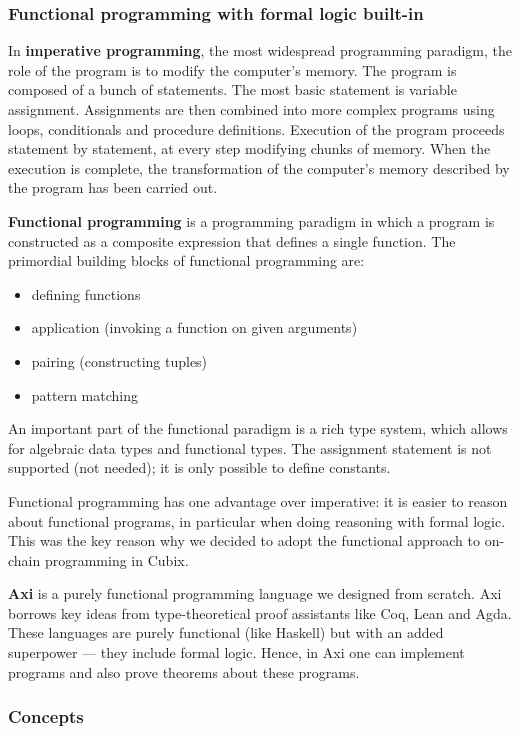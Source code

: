 \documentclass[a4paper]{article}
\begin{document}
\subsubsection{Functional programming with formal logic built-in}

In \textbf{imperative programming}, the most widespread programming paradigm, the role of the program is to modify the computer's memory. The program is composed of a bunch of statements. The most basic statement is variable assignment. Assignments are then combined into more complex programs using loops, conditionals and procedure definitions. Execution of the program proceeds statement by statement, at every step modifying chunks of memory. When the execution is complete, the transformation of the computer's memory described by the program has been carried out.

\textbf{Functional programming} is a programming paradigm in which a program is constructed as a composite expression that defines a single function. The primordial building blocks of functional programming are:

\begin{itemize}
  \item defining functions
  \item application (invoking a function on given arguments)
  \item pairing (constructing tuples)
  \item pattern matching
\end{itemize}

An important part of the functional paradigm is a rich type system, which allows for algebraic data types and functional types. The assignment statement is not supported (not needed); it is only possible to define constants.

Functional programming has one advantage over imperative: it is easier to reason about functional programs, in particular when doing reasoning with formal logic. This was the key reason why we decided to adopt the functional approach to on-chain programming in Cubix.

\textbf{Axi} is a purely functional programming language we designed from scratch. Axi borrows key ideas from type-theoretical proof assistants like Coq, Lean and Agda. These languages are purely functional (like Haskell) but with an added superpower --- they include formal logic. Hence, in Axi one can implement programs and also prove theorems about these programs.

\subsubsection{Concepts}
\end{document}
